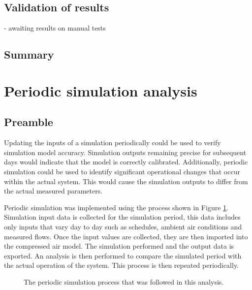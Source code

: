 	
	\subsection{Validation of results}
	
	- awaiting results on manual tests
	
	\subsection{Summary}
\newpage
\section{Periodic simulation analysis}
	\subsection{Preamble}
	Updating the inputs of a simulation periodically could be used to verify simulation model accuracy. Simulation outputs remaining precise for subsequent days would indicate that the model is correctly calibrated. Additionally, periodic simulation could be used to identify significant operational changes that occur within the actual system. This would cause the simulation outputs to differ from the actual measured parameters. 
	\par 
	Periodic simulation was implemented using the process shown in Figure \ref{fig: PeriodicProcess}. Simulation input data is collected for the simulation period, this data includes only inputs that vary day to day such as schedules, ambient air conditions and  measured flows. Once the input values are collected, they are then imported into the compressed air model. The simulation performed and the output data is exported. An analysis is then performed to compare the simulated period with the actual operation of the system. This process is then repeated periodically.
		\begin{figure}[h]
		\centering
		\caption{The periodic simulation process that was followed in this analysis.}
		\label{fig: PeriodicProcess}
	\end{figure}	
